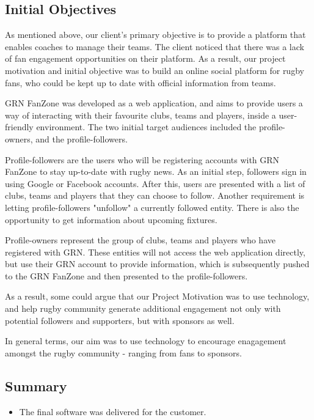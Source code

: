 \documentclass{l3proj}
\begin{document}
\subsection{Initial Objectives}
As mentioned above, our client's primary objective is to provide a platform that
 enables coaches to manage their teams.  The client noticed that there was a lack of
 fan engagement opportunities on their platform. As a result, our project motivation 
 and initial objective was to build an online social platform for rugby fans, who could
 be kept up to date with official information from teams.

GRN FanZone was developed as a web application, and aims to provide users a way of
 interacting with their favourite clubs, teams and players, inside a user-friendly
 environment. The two initial target audiences included the profile-owners, and the
 profile-followers.

Profile-followers are the users who will be registering accounts with GRN FanZone to
 stay up-to-date with rugby news. As an initial step, followers sign in using Google or 
 Facebook accounts. After this, users are presented with a list of clubs, teams and players
 that they can choose to follow. Another requirement is letting profile-followers "unfollow"
 a currently followed entity. There is also the opportunity to get information about 
 upcoming fixtures.

Profile-owners represent the group of clubs, teams and players who have registered with
 GRN. These entities will not access the web application directly, but use their GRN account
 to provide information, which is subsequently pushed to the GRN FanZone and then presented
 to the profile-followers.

As a result, some could argue that our Project Motivation was to use technology, and help
rugby community generate additional engagement not only with potential followers and
supporters, but with sponsors as well.

In general terms, our aim was to use technology to encourage enagagement amongst the 
 rugby community - ranging from fans to sponsors.

\subsection{Summary}
\begin{itemize}
\item The final software was delivered for the customer.
\end{itemize}
\end{document}
